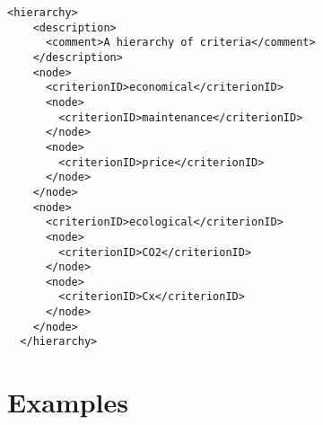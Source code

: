 \documentclass[a4paper,oneside,10 pt]{article}
\newcommand{\code}{\asciifamily}
\begin{document}
{\code
\begin{lstlisting}[style=prototype]
 <hierarchy>
    <description>
      <comment>A hierarchy of criteria</comment>
    </description>
    <node>
      <criterionID>economical</criterionID>
      <node>
        <criterionID>maintenance</criterionID>
      </node>
      <node>
        <criterionID>price</criterionID>
      </node>
    </node>
    <node>
      <criterionID>ecological</criterionID>
      <node>
        <criterionID>CO2</criterionID>
      </node>
      <node>
        <criterionID>Cx</criterionID>
      </node>
    </node>
  </hierarchy>
\end{lstlisting}
}



\section{Examples}
\end{document}
